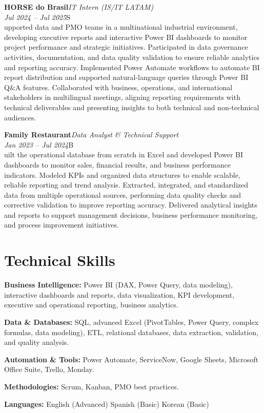 \documentclass[11pt,a4paper]{article}
\newcommand{\cvrole}[4]{%
  \vspace{4pt}%
  {\bfseries\color{accentcolor}#1}\hfill{\itshape #2}\\[-2pt]%
  {\itshape #3}\hfill #4\\[6pt]%
}
\begin{document}
\cvrole{HORSE do Brasil}{IT Intern (IS/IT LATAM)}{Jul 2024 -- Jul 2025}

Supported data and PMO teams in a multinational industrial environment, developing executive reports and interactive Power BI dashboards to monitor project performance and strategic initiatives. Participated in data governance activities, documentation, and data quality validation to ensure reliable analytics and reporting accuracy. Implemented Power Automate workflows to automate BI report distribution and supported natural-language queries through Power BI Q\&A features. Collaborated with business, operations, and international stakeholders in multilingual meetings, aligning reporting requirements with technical deliverables and presenting insights to both technical and non-technical audiences.

\cvrole{Family Restaurant}{Data Analyst \& Technical Support}{Jan 2023 -- Jul 2024}

Built the operational database from scratch in Excel and developed Power BI dashboards to monitor sales, financial results, and business performance indicators. Modeled KPIs and organized data structures to enable scalable, reliable reporting and trend analysis. Extracted, integrated, and standardized data from multiple operational sources, performing data quality checks and corrective validation to improve reporting accuracy. Delivered analytical insights and reports to support management decisions, business performance monitoring, and process improvement initiatives.

\section{Technical Skills}

\textbf{Business Intelligence:} Power BI (DAX, Power Query, data modeling), interactive dashboards and reports, data visualization, KPI development, executive and operational reporting, business analytics.

\textbf{Data \& Databases:} SQL, advanced Excel (PivotTables, Power Query, complex formulas, data modeling), ETL, relational databases, data extraction, validation, and quality analysis.

\textbf{Automation \& Tools:} Power Automate, ServiceNow, Google Sheets, Microsoft Office Suite, Trello, Monday.

\textbf{Methodologies:} Scrum, Kanban, PMO best practices.

\textbf{Languages:} English (Advanced) \enspace\textbullet\enspace Spanish (Basic) \enspace\textbullet\enspace Korean (Basic)
\end{document}
